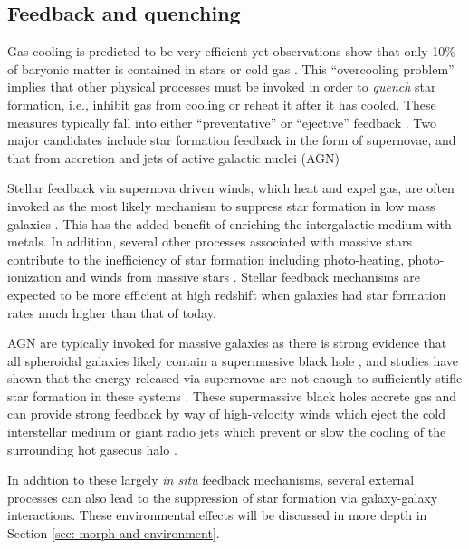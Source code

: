 \subsection{Feedback and quenching}

Gas cooling is predicted to be very efficient yet observations show that only 10\% of baryonic matter is contained in stars or cold gas \citep{Fukugita2004}. This ``overcooling problem'' implies that other physical processes must be invoked in order to \textit{quench} star formation, i.e., inhibit gas from cooling or reheat it after it has cooled. These measures typically fall into either ``preventative'' or ``ejective'' feedback \citep{Gabor2010,Keres2009b}. Two major candidates include star formation feedback in the form of supernovae, and that from accretion and jets of active galactic nuclei (AGN)

Stellar feedback via supernova driven winds, which heat and expel gas, are often invoked as the most likely mechanism to suppress star formation in low mass galaxies \citep{DekelSilk1986,White1978}. This has the added benefit of enriching the intergalactic medium with metals. In addition, several other processes associated with massive stars contribute to the inefficiency of star formation including photo-heating, photo-ionization and winds from massive stars \citep[e.g., review by][]{Hopkins2012}. Stellar feedback mechanisms are expected to be more efficient at high redshift when galaxies had star formation rates much higher than that of today. 

AGN are typically invoked for massive galaxies as there is strong evidence that all spheroidal galaxies likely contain a supermassive black hole \citep{KormendyHo2013}, and studies have shown that the energy released via supernovae are not enough to sufficiently stifle star formation in these systems \citep{Springel2005}. These supermassive black holes accrete gas and can provide strong feedback by way of high-velocity winds which eject the cold interstellar medium or giant radio jets which prevent or slow the cooling of the surrounding hot gaseous halo \citep{Fabian2012,HeckmanBest2014}.  

In addition to these largely \textit{in situ} feedback mechanisms, several external processes can also lead to the suppression of star formation via galaxy-galaxy interactions. These environmental effects will be discussed in more depth in Section \ref{sec: morph and environment}. 


